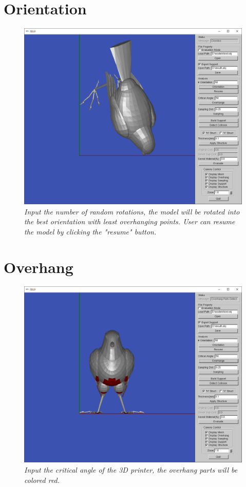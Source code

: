 \documentclass[11pt, a4paper]{article}
\begin{document}
	\section{Orientation}
	\begin{figure}[H]
  		\centering
      	\includegraphics[width=1.0\textwidth]{orientation.png}
  	\caption{\textit{Input the number of random rotations, the model will be rotated into the best orientation with least overhanging points. User can resume the model by clicking the "resume" button.}}
	\end{figure}
	\section{Overhang}
	\begin{figure}[H]
  		\centering
      	\includegraphics[width=1.0\textwidth]{overhang.png}
  	\caption{\textit{Input the critical angle of the 3D printer, the overhang parts will be colored red.}}
	\end{figure}
\end{document}
